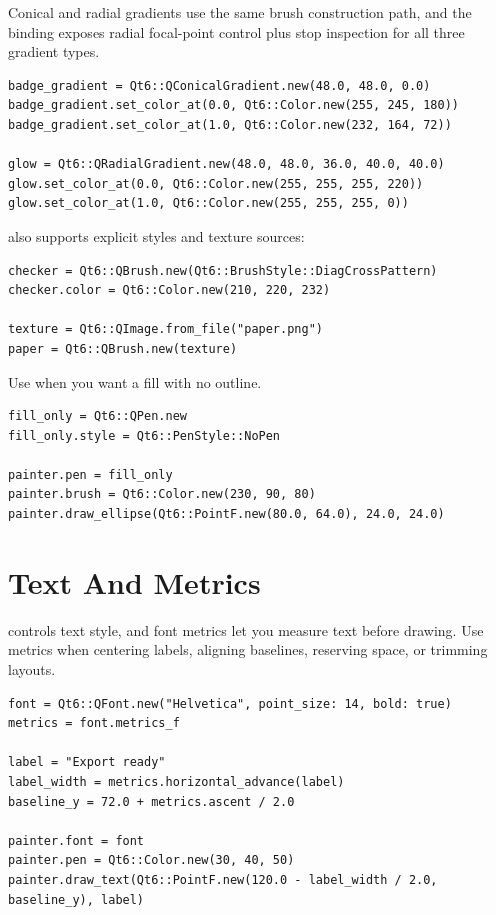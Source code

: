 Conical and radial gradients use the same brush construction path, and the binding exposes radial focal-point control plus stop inspection for all three gradient types.

\begin{lstlisting}[style=crystal]
badge_gradient = Qt6::QConicalGradient.new(48.0, 48.0, 0.0)
badge_gradient.set_color_at(0.0, Qt6::Color.new(255, 245, 180))
badge_gradient.set_color_at(1.0, Qt6::Color.new(232, 164, 72))

glow = Qt6::QRadialGradient.new(48.0, 48.0, 36.0, 40.0, 40.0)
glow.set_color_at(0.0, Qt6::Color.new(255, 255, 255, 220))
glow.set_color_at(1.0, Qt6::Color.new(255, 255, 255, 0))
\end{lstlisting}

 also supports explicit styles and texture sources:

\begin{lstlisting}[style=crystal]
checker = Qt6::QBrush.new(Qt6::BrushStyle::DiagCrossPattern)
checker.color = Qt6::Color.new(210, 220, 232)

texture = Qt6::QImage.from_file("paper.png")
paper = Qt6::QBrush.new(texture)
\end{lstlisting}

Use  when you want a fill with no outline.

\begin{lstlisting}[style=crystal]
fill_only = Qt6::QPen.new
fill_only.style = Qt6::PenStyle::NoPen

painter.pen = fill_only
painter.brush = Qt6::Color.new(230, 90, 80)
painter.draw_ellipse(Qt6::PointF.new(80.0, 64.0), 24.0, 24.0)
\end{lstlisting}

\section{Text And Metrics}

 controls text style, and font metrics let you measure text before drawing. Use metrics when centering labels, aligning baselines, reserving space, or trimming layouts.

\begin{lstlisting}[style=crystal]
font = Qt6::QFont.new("Helvetica", point_size: 14, bold: true)
metrics = font.metrics_f

label = "Export ready"
label_width = metrics.horizontal_advance(label)
baseline_y = 72.0 + metrics.ascent / 2.0

painter.font = font
painter.pen = Qt6::Color.new(30, 40, 50)
painter.draw_text(Qt6::PointF.new(120.0 - label_width / 2.0, baseline_y), label)
\end{lstlisting}

